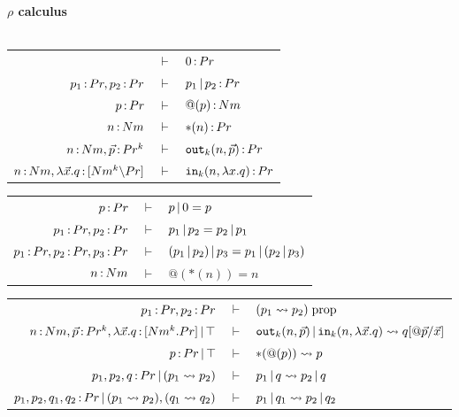 \documentclass{article}
\begin{document}
\begin{mdframed}
\begin{center}
    \textbf{$\rho$ calculus}\\~\\
    \renewcommand{\arraystretch}{1.2}

    \begin{tabular}{rcl}
        & $\vdash$ & $0\,{:}\, Pr$\\
        $p_1\,{:}\, Pr, p_2\,{:}\, Pr$ & $\vdash$ & $p_1\,|\, p_2\,{:}\, Pr$\\
        $p\,{:}\, Pr$ & $\vdash$ & $@(p)\,{:}\, Nm$\\
        $n\,{:}\, Nm$ & $\vdash$ & $\ast(n)\,{:}\, Pr$\\
        $n\,{:}\, Nm,\vec{p}\,{:}\, Pr^k$ & $\vdash$ & $\mathtt{out}_k(n,\vec{p})\,{:}\, Pr$\\
        $n\,{:}\, Nm, \lambda \vec{x}.q\,{:}\, [Nm^k{\setminus} Pr]$ & $\vdash$ & $\mathtt{in}_k(n,\lambda x.q)\,{:}\, Pr$
    \end{tabular}

    \vspace{1em}
    
    \begin{tabular}{rcl}
         $p\,{:}\, Pr$ & $\vdash$ & $p\,|\, 0 = p$\\
        $p_1\,{:}\, Pr, p_2\,{:}\, Pr$ & $\vdash$ & $p_1\,|\, p_2 = p_2\,|\, p_1$\\
        $p_1\,{:}\, Pr,p_2\,{:}\, Pr,p_3\,{:}\, Pr$ & $\vdash$ & $(p_1\,|\, p_2)\,|\, p_3 = p_1\,|\, (p_2\,|\, p_3)$\\
        $n\,{:}\, Nm$ & $\vdash$ & $@(\ast(n)) = n$
    \end{tabular}

    \vspace{1em}
    
    \begin{tabular}{rcl}
         $p_1\,{:}\, Pr,p_2\,{:}\, Pr$ & $\vdash$ & $(p_1\rightsquigarrow p_2)\; \mathrm{prop}$\\
         $n\,{:}\, Nm,\vec{p}\,{:}\, Pr^k, \lambda \vec{x}.q\,{:}\, [Nm^k.Pr]\,|\, \top$ & $\vdash$ & $\mathtt{out}_k(n,\vec{p})\,|\, \mathtt{in}_k(n,\lambda \vec{x}.q)\rightsquigarrow  q[@\vec{p}/\vec{x}]$\\
         $p\,{:}\, Pr \,|\, \top$ & $\vdash$ & $\ast(@(p))\rightsquigarrow p$\\
         $p_1,p_2,q\,{:}\, Pr\,|\, (p_1\rightsquigarrow p_2)$ & $\vdash$ & $ p_1\,|\, q\rightsquigarrow  p_2\,|\, q$\\
         $p_1,p_2,q_1,q_2\,{:}\, Pr\,|\, (p_1\rightsquigarrow p_2), (q_1\rightsquigarrow q_2)$ & $\vdash$ & $p_1\,|\, q_1\rightsquigarrow p_2\,|\, q_2$
    \end{tabular}
\end{center}
\end{mdframed}
\end{document}
